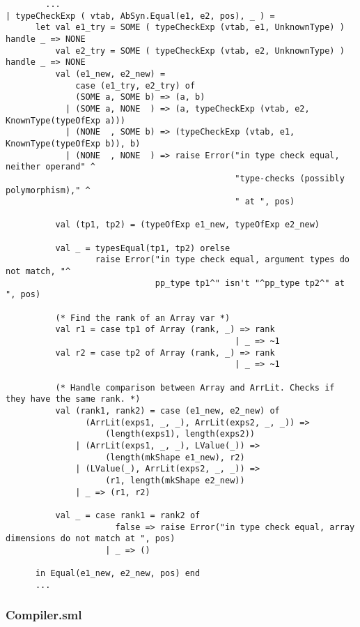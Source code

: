 \documentclass[12pt]{article}
\begin{document}
\begin{lstlisting}
        ...
| typeCheckExp ( vtab, AbSyn.Equal(e1, e2, pos), _ ) =
      let val e1_try = SOME ( typeCheckExp (vtab, e1, UnknownType) ) handle _ => NONE
          val e2_try = SOME ( typeCheckExp (vtab, e2, UnknownType) ) handle _ => NONE
          val (e1_new, e2_new) =
              case (e1_try, e2_try) of
              (SOME a, SOME b) => (a, b)
            | (SOME a, NONE  ) => (a, typeCheckExp (vtab, e2, KnownType(typeOfExp a)))
            | (NONE  , SOME b) => (typeCheckExp (vtab, e1, KnownType(typeOfExp b)), b)
            | (NONE  , NONE  ) => raise Error("in type check equal, neither operand" ^
                                              "type-checks (possibly polymorphism)," ^
                                              " at ", pos)

          val (tp1, tp2) = (typeOfExp e1_new, typeOfExp e2_new)

          val _ = typesEqual(tp1, tp2) orelse
                  raise Error("in type check equal, argument types do not match, "^
                              pp_type tp1^" isn't "^pp_type tp2^" at ", pos)

          (* Find the rank of an Array var *)
          val r1 = case tp1 of Array (rank, _) => rank
                                              | _ => ~1
          val r2 = case tp2 of Array (rank, _) => rank
                                              | _ => ~1             

          (* Handle comparison between Array and ArrLit. Checks if they have the same rank. *)                                                
          val (rank1, rank2) = case (e1_new, e2_new) of 
                (ArrLit(exps1, _, _), ArrLit(exps2, _, _)) => 
                    (length(exps1), length(exps2))
              | (ArrLit(exps1, _, _), LValue(_)) =>
                    (length(mkShape e1_new), r2)
              | (LValue(_), ArrLit(exps2, _, _)) =>
                    (r1, length(mkShape e2_new))
              | _ => (r1, r2)

          val _ = case rank1 = rank2 of
                      false => raise Error("in type check equal, array dimensions do not match at ", pos)
                    | _ => ()

      in Equal(e1_new, e2_new, pos) end
      ...
\end{lstlisting}

\subsubsection{Compiler.sml}
\end{document}
